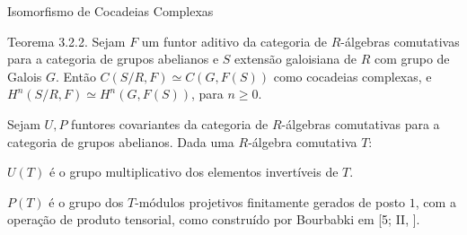 \documentclass{beamer}
\begin{document}
\begin{frame}[fragile]{Isomorfismo de Cocadeias Complexas}
    \begin{center}
\end{center}
\end{frame}


\begin{frame}{Teorema 3.2.2.}
    Sejam $F$ um funtor aditivo da categoria de $R$-álgebras comutativas para a categoria de grupos abelianos e $S$ extensão galoisiana de $R$ com grupo de Galois $G$. Então $C(S/R,F) \simeq C(G,F(S))$ como cocadeias complexas, e $H^n(S/R,F)\simeq H^n(G,F(S))$, para $n \geq 0$.
\end{frame}

\begin{frame}[fragile]
    \begin{center}
\end{center}
\end{frame}

\begin{frame}
    Sejam $U, P$ funtores covariantes da categoria de $R$-álgebras comutativas para a categoria de grupos abelianos. Dada uma $R$-álgebra comutativa $T$:
    
    \vspace{18pt}
    
    $U(T)$ é o grupo multiplicativo dos elementos invertíveis de $T$.
    
    \vspace{18pt}
    
    $P(T)$ é o grupo dos $T$-módulos projetivos finitamente gerados de posto $1$, com a operação de produto tensorial, como construído por Bourbabki em [5; II, ].
\end{frame}
\end{document}
